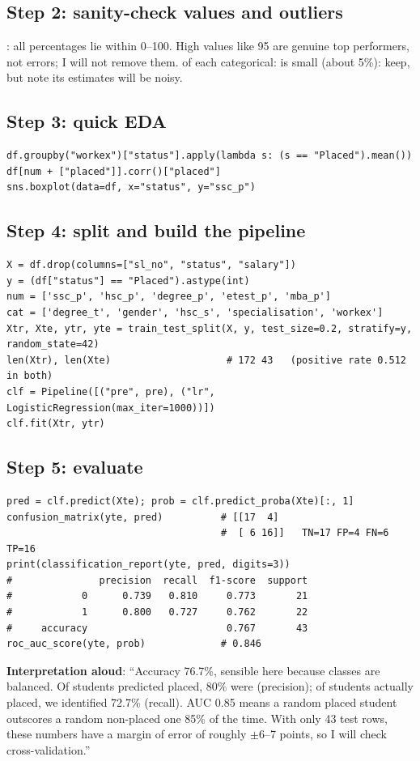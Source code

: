 \subsection{Step 2: sanity-check values and outliers}
: all percentages lie within 0--100. High values like 95 are genuine top performers, not errors; I will not remove them.
 of each categorical:  is small (about 5\%): keep, but note its estimates will be noisy.

\subsection{Step 3: quick EDA}
\begin{lstlisting}
df.groupby("workex")["status"].apply(lambda s: (s == "Placed").mean())
df[num + ["placed"]].corr()["placed"]
sns.boxplot(data=df, x="status", y="ssc_p")
\end{lstlisting}

\subsection{Step 4: split and build the pipeline}
\begin{lstlisting}
X = df.drop(columns=["sl_no", "status", "salary"])
y = (df["status"] == "Placed").astype(int)
num = ['ssc_p', 'hsc_p', 'degree_p', 'etest_p', 'mba_p']
cat = ['degree_t', 'gender', 'hsc_s', 'specialisation', 'workex']
Xtr, Xte, ytr, yte = train_test_split(X, y, test_size=0.2, stratify=y, random_state=42)
len(Xtr), len(Xte)                    # 172 43   (positive rate 0.512 in both)
clf = Pipeline([("pre", pre), ("lr", LogisticRegression(max_iter=1000))])
clf.fit(Xtr, ytr)
\end{lstlisting}

\subsection{Step 5: evaluate}
\begin{lstlisting}
pred = clf.predict(Xte); prob = clf.predict_proba(Xte)[:, 1]
confusion_matrix(yte, pred)          # [[17  4]
                                     #  [ 6 16]]   TN=17 FP=4 FN=6 TP=16
print(classification_report(yte, pred, digits=3))
#               precision  recall  f1-score  support
#            0      0.739   0.810     0.773       21
#            1      0.800   0.727     0.762       22
#     accuracy                        0.767       43
roc_auc_score(yte, prob)             # 0.846
\end{lstlisting}
\textbf{Interpretation aloud}: ``Accuracy 76.7\%, sensible here because classes are balanced. Of students predicted placed, 80\% were (precision); of students actually placed, we
identified 72.7\% (recall). AUC 0.85 means a random placed student outscores a random non-placed one 85\% of the time. With only 43 test rows, these numbers have a margin of error
of roughly $\pm$6--7 points, so I will check cross-validation.''

